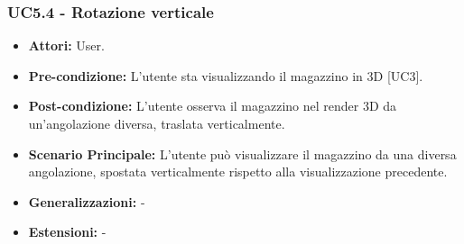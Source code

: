 \subsubsection{UC5.4 - Rotazione verticale}
\begin{itemize}
    \item \textbf{Attori:} User.
    \item \textbf{Pre-condizione:}  L'utente sta visualizzando il magazzino in 3D [UC3].
    \item \textbf{Post-condizione:} L'utente osserva il magazzino nel render 3D da un'angolazione diversa, traslata verticalmente.
    \item \textbf{Scenario Principale:} L'utente può visualizzare il magazzino da una diversa angolazione, spostata verticalmente rispetto alla visualizzazione precedente.
    \item \textbf{Generalizzazioni:} -
    \item \textbf{Estensioni:} -
\end{itemize}